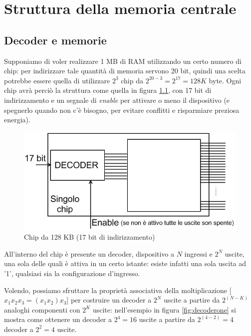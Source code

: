 \chapter{Struttura della memoria centrale}
\label{cha:centralMem}

\section{Decoder e memorie}
\label{sec:decoderMemorie}

Supponiamo di voler realizzare 1 MB di RAM utilizzando un certo numero di chip: per indirizzare tale quantità di memoria servono 20 bit, quindi una scelta potrebbe essere quella di utilizzare $2^3$ chip da $2^{20-3}=2^{17}=128K$ byte. Ogni chip avrà perciò la struttura come quella in figura \ref{fig:decoderino}, con 17 bit di indirizzamento e un segnale di \textit{enable} per attivare o meno il dispositivo (e spegnerlo quando non c'è bisogno, per evitare conflitti e risparmiare preziosa energia).

\begin{figure}[!h]
\centering
\includegraphics[width=0.65\columnwidth]{img/decoderino}
\caption{Chip da 128 KB (17 bit di indirizzamento)}
\label{fig:decoderino}
\end{figure}

All'interno del chip è presente un decoder, dispositivo a $N$ ingressi e $2^N$ uscite, una sola delle quali è attiva in un certo istante: esiste infatti una sola uscita ad '1', qualsiasi sia la configurazione d'ingresso.

Volendo, possiamo sfruttare la proprietà associativa della moltiplicazione [$x_1x_2x_3=(x_1x_2)x_3$] per costruire un decoder a $2^N$ uscite a partire da $2^{(N-K)}$ analoghi componenti con $2^K$ uscite: nell'esempio in figura \ref{fig:decoderone} si mostra come ottenere un decoder a $2^4=16$ uscite a partire da $2^{(4-2)}=4$ decoder a $2^2=4$ uscite.

